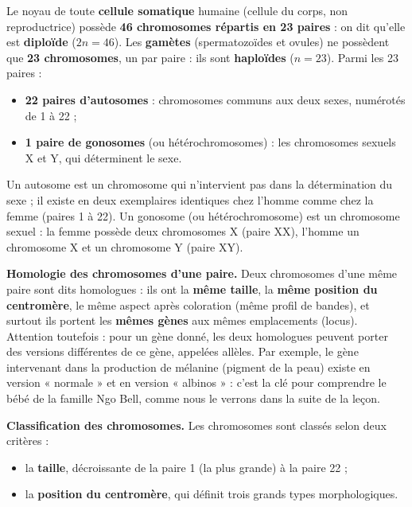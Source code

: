\documentclass[11pt]{article}
\newcommand{\cle}[1]{{\popxbold\color{popdark}#1}}
\begin{document}
\begin{propriete}
Le noyau de toute \textbf{cellule somatique} humaine (cellule du corps, non reproductrice) possède \textbf{46 chromosomes répartis en 23 paires} : on dit qu'elle est \textbf{diploïde} ($2n = 46$). Les \textbf{gamètes} (spermatozoïdes et ovules) ne possèdent que \textbf{23 chromosomes}, un par paire : ils sont \textbf{haploïdes} ($n = 23$). Parmi les 23 paires :
\begin{itemize}
\item \textbf{22 paires d'autosomes} : chromosomes communs aux deux sexes, numérotés de 1 à 22 ;
\item \textbf{1 paire de gonosomes} (ou \cle{hétérochromosomes}) : les chromosomes sexuels X et Y, qui déterminent le sexe.
\end{itemize}
\end{propriete}

\begin{definition}
Un \cle{autosome} est un chromosome qui n'intervient pas dans la détermination du sexe ; il existe en deux exemplaires identiques chez l'homme comme chez la femme (paires 1 à 22). Un \cle{gonosome} (ou hétérochromosome) est un chromosome sexuel : la femme possède deux chromosomes X (paire XX), l'homme un chromosome X et un chromosome Y (paire XY).
\end{definition}

\textbf{Homologie des chromosomes d'une paire.} Deux chromosomes d'une même paire sont dits \cle{homologues} : ils ont la \textbf{même taille}, la \textbf{même position du centromère}, le même aspect après coloration (même profil de bandes), et surtout ils portent les \textbf{mêmes gènes} aux mêmes emplacements (locus). Attention toutefois : pour un gène donné, les deux homologues peuvent porter des versions différentes de ce gène, appelées \cle{allèles}. Par exemple, le gène intervenant dans la production de mélanine (pigment de la peau) existe en version « normale » et en version « albinos » : c'est la clé pour comprendre le bébé de la famille Ngo Bell, comme nous le verrons dans la suite de la leçon.

\textbf{Classification des chromosomes.} Les chromosomes sont classés selon deux critères :
\begin{itemize}
\item la \textbf{taille}, décroissante de la paire 1 (la plus grande) à la paire 22 ;
\item la \textbf{position du centromère}, qui définit trois grands types morphologiques.
\end{itemize}
\end{document}

